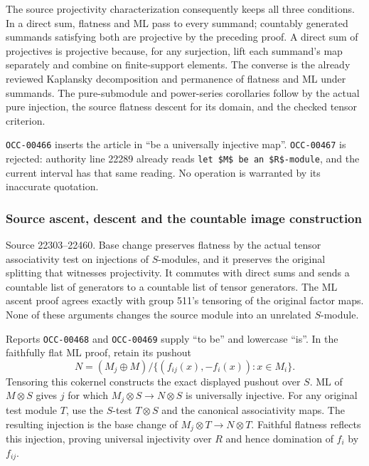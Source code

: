 The source projectivity characterization consequently keeps all three conditions. In a direct sum, flatness and ML pass to every summand; countably generated summands satisfying both are projective by the preceding proof. A direct sum of projectives is projective because, for any surjection, lift each summand's map separately and combine on finite-support elements. The converse is the already reviewed Kaplansky decomposition and permanence of flatness and ML under summands. The pure-submodule and power-series corollaries follow by the actual pure injection, the source flatness descent for its domain, and the checked tensor criterion.

\texttt{OCC-00466} inserts the article in ``be a universally injective map''. \texttt{OCC-00467} is rejected: authority line 22289 already reads \texttt{let\ \$M\$\ be\ an\ \$R\$-module}, and the current interval has that same reading. No operation is warranted by its inaccurate quotation.

\subsubsection{Source ascent, descent and the countable image construction}\label{algebra-proof-013-source-ascent-descent-and-the-countable-image-construction}

Source 22303--22460. Base change preserves flatness by the actual tensor associativity test on injections of \(S\)-modules, and it preserves the original splitting that witnesses projectivity. It commutes with direct sums and sends a countable list of generators to a countable list of tensor generators. The ML ascent proof agrees exactly with group 511's tensoring of the original factor maps. None of these arguments changes the source module into an unrelated \(S\)-module.

Reports \texttt{OCC-00468} and \texttt{OCC-00469} supply ``to be'' and lowercase ``is''. In the faithfully flat ML proof, retain its pushout \[
N=(M_j\oplus M)/\{(f_{ij}(x),-f_i(x)):x\in M_i\}.
\] Tensoring this cokernel constructs the exact displayed pushout over \(S\). ML of \(M\otimes S\) gives \(j\) for which \(M_j\otimes S\to N\otimes S\) is universally injective. For any original test module \(T\), use the \(S\)-test \(T\otimes S\) and the canonical associativity maps. The resulting injection is the base change of \(M_j\otimes T\to N\otimes T\). Faithful flatness reflects this injection, proving universal injectivity over \(R\) and hence domination of \(f_i\) by \(f_{ij}\).

